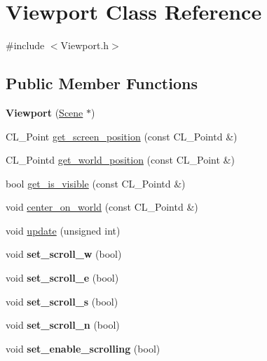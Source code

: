 \hypertarget{classViewport}{
\section{Viewport Class Reference}
\label{classViewport}
}


{\ttfamily \#include $<$Viewport.h$>$}

\subsection*{Public Member Functions}
\begin{DoxyCompactItemize}
\item 
\hypertarget{classViewport_aaca5213263cd1d9396133e2e50a8912e}{
{\bfseries Viewport} (\hyperlink{classScene}{Scene} $\ast$)}
\label{classViewport_aaca5213263cd1d9396133e2e50a8912e}

\item 
CL\_\-Point \hyperlink{classViewport_a6fa5e4483a38e8775252bfa1467cdc77}{get\_\-screen\_\-position} (const CL\_\-Pointd \&)
\item 
CL\_\-Pointd \hyperlink{classViewport_a73064b60005187e3762f16618298e651}{get\_\-world\_\-position} (const CL\_\-Point \&)
\item 
bool \hyperlink{classViewport_a4a80ef891f5678d6debdaa8a988a5bd0}{get\_\-is\_\-visible} (const CL\_\-Pointd \&)
\item 
void \hyperlink{classViewport_acacc14d6b2ca0f48734b0ae392938886}{center\_\-on\_\-world} (const CL\_\-Pointd \&)
\item 
void \hyperlink{classViewport_ad6b4c3ce84e139598414bb61c4802e17}{update} (unsigned int)
\item 
\hypertarget{classViewport_a3ecf4cc556e2f263f6096735ba49deef}{
void {\bfseries set\_\-scroll\_\-w} (bool)}
\label{classViewport_a3ecf4cc556e2f263f6096735ba49deef}

\item 
\hypertarget{classViewport_a2ed43f02a30e2e27e671c7c80a60330b}{
void {\bfseries set\_\-scroll\_\-e} (bool)}
\label{classViewport_a2ed43f02a30e2e27e671c7c80a60330b}

\item 
\hypertarget{classViewport_a7dce4c5f2fa304c0faa661bfc8437cce}{
void {\bfseries set\_\-scroll\_\-s} (bool)}
\label{classViewport_a7dce4c5f2fa304c0faa661bfc8437cce}

\item 
\hypertarget{classViewport_a7fd5cd6fc729ac2c42106d073775d089}{
void {\bfseries set\_\-scroll\_\-n} (bool)}
\label{classViewport_a7fd5cd6fc729ac2c42106d073775d089}

\item 
\hypertarget{classViewport_a635a0926d12b7ea83c9f46731c401ba8}{
void {\bfseries set\_\-enable\_\-scrolling} (bool)}
\label{classViewport_a635a0926d12b7ea83c9f46731c401ba8}

\end{DoxyCompactItemize}
